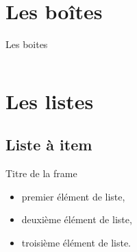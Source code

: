 \documentclass{bredelebeamer}
\begin{document}
    \section{Les bo\^ites}

    \begin{frame}{Les boites}

        \begin{columns}

            \begin{column}{0.5\textwidth}


            \end{column}

            \begin{column}{0.5\textwidth}



            \end{column}

        \end{columns}


    \end{frame}



    \section{Les listes}
    \subsection{Liste à item}

    \begin{frame}{Titre de la frame}

        \begin{itemize}
            \item premier élément de liste,
            \item deuxième élément de liste,
            \item troisième élément de liste.
        \end{itemize}
    \end{frame}
\end{document}
